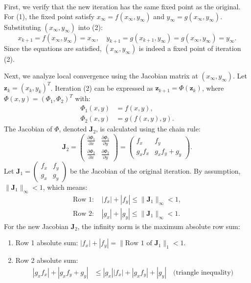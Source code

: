 \begin{solution}
First, we verify that the new iteration has the same fixed point as the original. For (1), the fixed point satisfy $x_\infty = f(x_\infty, y_\infty)$ and $y_\infty = g(x_\infty, y_\infty)$. Substituting $(x_\infty, y_\infty)$ into (2):
\[ x_{k+1} = f(x_\infty, y_\infty) = x_\infty, \quad y_{k+1} = g(x_{k+1}, y_\infty) = g(x_\infty, y_\infty) = y_\infty. \]
Since the equations are satisfied, $(x_\infty, y_\infty)$ is indeed a fixed point of iteration (2).

Next, we analyze local convergence using the Jacobian matrix at $(x_\infty, y_\infty)$. Let $\mathbf{z}_k = (x_k, y_k)^T$. Iteration (2) can be expressed as $\mathbf{z}_{k+1} = \Phi(\mathbf{z}_k)$, where $\Phi(x, y) = (\Phi_1, \Phi_2)^T$ with:
\begin{align*}
\Phi_1(x, y) &= f(x, y), \\
\Phi_2(x, y) &= g(f(x, y), y).
\end{align*}
The Jacobian of $\Phi$, denoted $\mathbf{J}_2$, is calculated using the chain rule:
\[ \mathbf{J}_2 = \begin{pmatrix} \frac{\partial \Phi_1}{\partial x} & \frac{\partial \Phi_1}{\partial y} \\ \frac{\partial \Phi_2}{\partial x} & \frac{\partial \Phi_2}{\partial y} \end{pmatrix} = \begin{pmatrix} f_x & f_y \\ g_x f_x & g_x f_y + g_y \end{pmatrix}. \]
Let $\mathbf{J}_1 = \begin{pmatrix} f_x & f_y \\ g_x & g_y \end{pmatrix}$ be the Jacobian of the original iteration. By assumption, $\|\mathbf{J}_1\|_\infty < 1$, which means:
\begin{align*}
\text{Row 1: } & |f_x| + |f_y| \leq \|\mathbf{J}_1\|_\infty < 1, \\
\text{Row 2: } & |g_x| + |g_y| \leq \|\mathbf{J}_1\|_\infty < 1.
\end{align*}
For the new Jacobian $\mathbf{J}_2$, the infinity norm is the maximum absolute row sum:
\begin{enumerate}
    \item Row 1 absolute sum: $|f_x| + |f_y| = \|\text{Row 1 of } \mathbf{J}_1\|_1 < 1$.
    \item Row 2 absolute sum: 
    \begin{align*}
    |g_x f_x| + |g_x f_y + g_y| &\leq |g_x| |f_x| + |g_x f_y| + |g_y| \quad \text{(triangle inequality)} \\

\end{align*}
\end{enumerate}
\end{solution}
